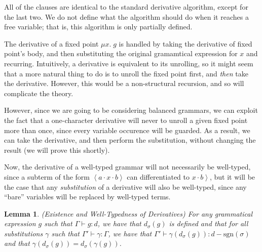 \documentclass{article}
\newcommand{\fix}[2]{\mu {#1}.\;{#2}}
\newcommand{\lft}[1]{\left<{#1}\right.}
\newcommand{\rgt}[1]{\left.{#1}\right>}
\newcommand{\judgebalance}[3][\Gamma]{{#1} \vdash {#2} : {#3}}
\newcommand{\judgesubst}[3]{{#1} \vdash {#2} : {#3}}
\newcommand{\deriv}[2]{d_{#1}({#2})}
\newtheorem{lemma}{Lemma}
\begin{document}
All of the clauses are identical to the standard derivative algorithm,
except for the last two. We do not define what the algorithm should do
when it reaches a free variable; that is, this algorithm is only
partially defined. 

The derivative of a fixed point $\fix{x}{g}$ is handled by taking the
derivative of fixed point's body, and then substituting the original
gramamtical expression for $x$ and recurring. Intuitively, a
derivative is equivalent to its unrolling, so it might seem that a
more natural thing to do is to unroll the fixed point first, and
\emph{then} take the derivative. However, this would be a
non-structural recursion, and so will complicate the theory.

However, since we are going to be considering balanced grammars, we
can exploit the fact that a one-character derivative will never to
unroll a given fixed point more than once, since every variable
occurence will be guarded. As a result, we can take the derivative,
and then perform the substitution, without changing the result (we
will prove this shortly). 

Now, the derivative of a well-typed grammar will not necessarily be
well-typed, since a subterm of the form $\lft{a}\cdot x \cdot\rgt{b}$ can
differentiated to $x\cdot\rgt{b}$, but it will be the case that any
\emph{substitution} of a derivative will also be well-typed, since
any ``bare'' variables will be replaced by well-typed terms. 

\begin{lemma}{(Existence and Well-Typedness of Derivatives)}
For any grammatical expression $g$ such that $\judgebalance{g}{d}$, 
we have that $\deriv{\sigma}{g}$ is defined and that for all 
substitutions $\gamma$ such that $\judgesubst{\Gamma'}{\gamma}{\Gamma}$, 
we have that $\judgebalance[\Gamma']{\gamma(\deriv{\sigma}{g})}{d - \mathrm{sgn}(\sigma)}$
and that $\gamma(\deriv{\sigma}{g}) = \deriv{\sigma}{\gamma(g)}$. 
\end{lemma}
\end{document}
